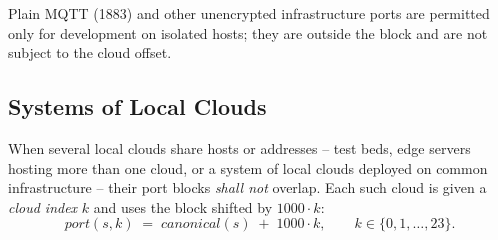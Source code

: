 Plain MQTT (1883) and other unencrypted infrastructure ports are permitted only for
development on isolated hosts; they are outside the block and are not subject to the cloud
offset.

\subsection{Systems of Local Clouds}
\label{sec:ports:sos}

When several local clouds share hosts or addresses -- test beds, edge servers hosting more
than one cloud, or a system of local clouds deployed on common infrastructure -- their port
blocks \emph{shall not} overlap. Each such cloud is given a \emph{cloud index} $k$ and uses the
block shifted by $1000\cdot k$:
\[
  \mathit{port}(s,k) \;=\; \mathit{canonical}(s) \;+\; 1000\cdot k,
  \qquad k \in \{0,1,\dots,23\}.
\]

